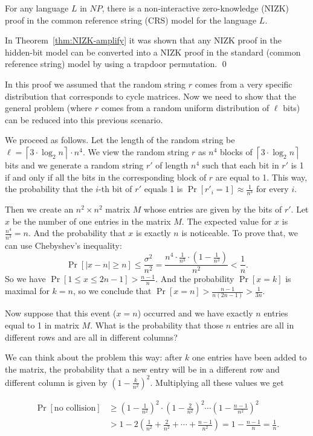 \begin{theorem}\label{the:NIZK_NP}
For any language $L$ in $NP$, there is a non-interactive zero-knowledge (NIZK) proof
in the common reference string (CRS) model for the language $L$.
\end{theorem}
\proof
In Theorem~\ref{thm:NIZK-amplify} it was shown that any NIZK proof in the hidden-bit model can
be converted into a NIZK proof in the standard (common reference string) model by using
a trapdoor permutation.
\qed


In this proof we assumed that the random string $r$ comes from a very specific distribution
that corresponds to cycle matrices.
Now we need to show that the general problem (where $r$ comes from a
random uniform distribution of $\ell$ bits) can be reduced into this previous scenario.

We proceed as follows.
Let the length of the random string be
$\ell=\left\lceil 3\cdot \log_2 n\right\rceil \cdot n^4$.
We view the random string $r$ as $n^4$ blocks of $\left\lceil 3\cdot \log_2 n\right\rceil$
bits and we generate a random string $r'$ of length $n^4$ such that each bit in $r'$
is 1 if and only if all the bits in the corresponding block of $r$ are equal to 1.
This way, the probability that the $i$-th bit of $r'$ equals 1 is $\Pr[r'_i=1]\approx\frac{1}{n^3}$ for every $i$.

Then we create an $n^2\times n^2$ matrix $M$ whose entries are given by the bits of $r'$.
Let $x$ be the number of one entries in the matrix $M$.
The expected value for $x$ is $\frac{n^4}{n^3}=n$.
And the probability that $x$ is exactly $n$ is noticeable. To prove that, we can use
Chebyshev's inequality:
$$\Pr[|x-n|\geq n]\leq\frac{\sigma^2}{n^2}=
\frac{n^4\cdot \frac{1}{n^3}\cdot\left(1-\frac{1}{n^3}\right)}{n^2}<\frac{1}{n}.$$
So we have $\Pr[1\leq x\leq 2n-1]>\frac{n-1}{n}$.
And the probability $\Pr[x=k]$ is maximal for $k=n$, so we conclude that
$\Pr[x=n]>\frac{n-1}{n(2n-1)}>\frac{1}{3n}$.

Now suppose that this event ($x=n$) occurred and we have exactly $n$ entries equal to 1
in matrix $M$. What is the probability that those $n$ entries are all in different rows
and are all in different columns?

We can think about the problem this way: after $k$ one entries have been added to the matrix,
the probability that a new entry will be in a different row and different column is given by
$\left(1-\frac{k}{n^2}\right)^2$. Multiplying all these values we get

\begin{align*}
\Pr[\text{no collision}] &\geq \left(1-\frac{1}{n^2}\right)^2 \cdot \left(1-\frac{2}{n^2}\right)^2
\cdots \left(1-\frac{n-1}{n^2}\right)^2 \\
& > 1 - 2\left(\frac{1}{n^2} + \frac{2}{n^2} +\cdots + \frac{n-1}{n^2}\right)
= 1 - \frac{n-1}{n} = \frac{1}{n}.
\end{align*}

